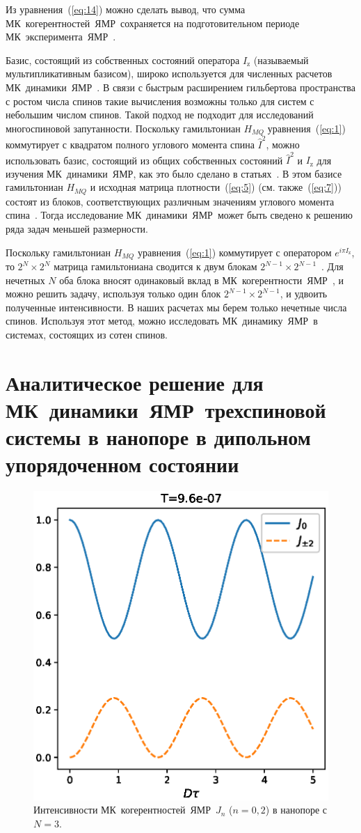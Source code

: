 \documentclass[utf8]{jetp}
\begin{document}
%
Из уравнения~(\ref{eq:14}) можно сделать вывод, что сумма МК~когерентностей~ЯМР~сохраняется на подготовительном периоде МК~эксперимента~ЯМР~\cite{Baum_1985}.

Базис, состоящий из собственных состояний оператора $I_\mathrm{z}$ (называемый мультипликативным базисом), широко используется для численных расчетов МК~динамики~ЯМР~\cite{Zhang_2009}.
В связи с быстрым расширением гильбертова пространства с ростом числа спинов такие вычисления возможны только для систем с небольшим числом спинов.
Такой подход не подходит для исследований многоспиновой запутанности.
Поскольку гамильтониан $H_{MQ}$ уравнения~(\ref{eq:1}) коммутирует с квадратом полного углового момента спина $\hat I^2$,
можно использовать базис, состоящий из общих собственных состояний $\hat I^2$ и $I_\mathrm{z}$ для изучения МК~динамики~ЯМР, как это было сделано в статьях~\cite{Doronin_2009,Doronin_2011,Doronin_2019}.
В этом базисе гамильтониан $H_{MQ}$ и исходная матрица плотности~(\ref{eq:5}) (см. также~(\ref{eq:7})) состоят из блоков, соответствующих различным значениям углового момента спина~\cite{Doronin_2009}.
Тогда исследование МК~динамики~ЯМР~может быть сведено к решению ряда задач меньшей размерности.

Поскольку гамильтониан $H_{MQ}$ уравнения~(\ref{eq:1}) коммутирует с оператором $e^{i\pi I_\mathrm{z}}$, то $2^N \times 2^N$ матрица гамильтониана сводится к двум блокам $2^{N-1} \times 2^{N-1}$~\cite{Doronin_2009}.
Для нечетных $N$ оба блока вносят одинаковый вклад в МК~когерентности~ЯМР~, и можно решить задачу, используя только один блок $2^{N-1} \times 2^{N-1}$, и удвоить полученные интенсивности.
В наших расчетах мы берем только нечетные числа спинов.
Используя этот метод, можно исследовать МК~динамику~ЯМР~в системах, состоящих из сотен спинов.

\section{Аналитическое решение для МК~динамики~ЯМР~трехспиновой системы в нанопоре в дипольном упорядоченном состоянии}
\label{sec:3}

\begin{figure}
  \centering
 	\includegraphics[width=0.5\linewidth]{coherences_n3_beta5.eps}
	\caption{
	  Интенсивности МК~когерентностей~ЯМР~$J_{n}$ ($n=0, 2$) в нанопоре с $N=3$.
	}
	\label{fig:1}
\end{figure}
\end{document}
